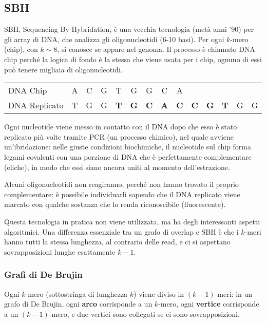 \subsection{SBH}
SBH, Sequencing By Hybridation, è una vecchia tecnologia (metà anni '90) per gli array di DNA, che analizza gli oligonucleotidi (6-10 basi). Per ogni $k$-mero (chip), con $k \sim 8$, si conosce se appare nel genoma. Il processo è chiamato DNA chip perché la logica di fondo è la stessa che viene usata per i chip, ognuno di essi può tenere migliaia di oligonucleotidi.

\begin{example}{}{}
	\begin{tabular}{l | *{13}{c}}
		DNA Chip		& A & C & G & T & G & G & C & A \\
		DNA Replicato	& T & G & G & \textbf{T} & \textbf{G} & \textbf{C} & \textbf{A} & \textbf{C} & \textbf{C} & \textbf{G} & \textbf{T} & G & G
	\end{tabular}
\end{example}

Ogni nucleotide viene messo in contatto con il DNA dopo che esso è stato replicato più volte tramite PCR (un processo chimico), nel quale avviene un'ibridazione: nelle giuste condizioni biochimiche, il nucleotide sul chip forma legami covalenti con una porzione di DNA che è perfettamente complementare (eliche), in modo che essi siano ancora uniti al momento dell'estrazione. 

Alcuni oligonucleotidi non reagiranno, perché non hanno trovato il proprio complementare: è possibile individuarli sapendo che il DNA replicato viene marcato con qualche sostanza che lo renda riconoscibile (fluorescente). 

Questa tecnologia in pratica non viene utilizzata, ma ha degli interessanti aspetti algoritmici. Una differenza essenziale tra un grafo di overlap e SBH è che i $k$-meri hanno tutti la stessa lunghezza, al contrario delle read, e ci si aspettano sovrapposizioni lunghe esattamente $k - 1$.

\subsubsection{Grafi di De Brujin}
Ogni $k$-mero (sottostringa di lunghezza $k$) viene diviso in $(k - 1)$-meri: in un grafo di De Brujin, ogni \textbf{arco} corrisponde a un $k$-mero, ogni \textbf{vertice} corrisponde a un $(k - 1)$-mero, e due vertici sono collegati se ci sono sovrapposizioni. 

